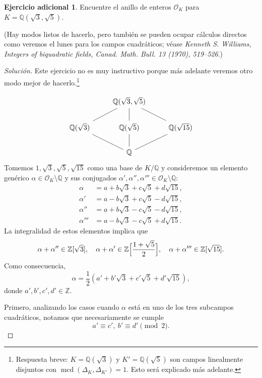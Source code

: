 \documentclass{article}
\theoremstyle{definition}
\newtheorem*{ejercicio-adicional}{Ejercicio adicional}
\newenvironment{solucion}{\begin{proof}[Solución]}{\end{proof}}
\newcommand{\ZZ}{\mathbb{Z}}
\newcommand{\QQ}{\mathbb{Q}}
\renewcommand{\gcd}{\operatorname{mcd}}
\renewcommand{\O}{\mathcal{O}}
\begin{document}
\begin{ejercicio-adicional}
  Encuentre el anillo de enteros $\mathcal{O}_K$ para
  $K = \mathbb{Q} (\sqrt{3}, \sqrt{5})$.

  \noindent (Hay modos listos de hacerlo, pero también se pueden ocupar cálculos
  directos como veremos el lunes para los campos cuadráticos; véase
  \emph{Kenneth S. Williams, Integers of biquadratic fields,
    Canad. Math. Bull. 13 (1970), 519--526}.)

  \ifdefined\solutions
  \begin{solucion}
    Este ejercicio no es muy instructivo porque más adelante veremos otro modo
    mejor de hacerlo.\footnote{Respuesta breve: $K = \QQ (\sqrt{3})$ y
      $K' = \QQ (\sqrt{5})$ son campos linealmente disjuntos con
      $\gcd (\Delta_K,\Delta_{K'}) = 1$. Esto será explicado más adelante.}

    \[ \begin{tikzcd}
      & \QQ(\sqrt{3},\sqrt{5})\ar[-]{dl}\ar[-]{d}\ar[-]{dr} \\
      \QQ(\sqrt{3})\ar[-]{dr} &
      \QQ(\sqrt{5})\ar[-]{d} &
      \QQ(\sqrt{15})\ar[-]{dl} \\
      & \QQ
      \end{tikzcd} \]
    Tomemos $1, \sqrt{3}, \sqrt{5},\sqrt{15}$ como una base de $K/\QQ$ y
    consideremos un elemento genérico $\alpha \in \O_K \setminus \QQ$ y sus
    conjugados $\alpha',\alpha'',\alpha''' \in \O_K \setminus \QQ$:
    \begin{align*}
      \alpha & = a + b\sqrt{3} + c\sqrt{5} + d\sqrt{15},\\
      \alpha' & = a - b\sqrt{3} + c\sqrt{5} - d\sqrt{15},\\
      \alpha'' & = a + b\sqrt{3} - c\sqrt{5} - d\sqrt{15},\\
      \alpha''' & = a - b\sqrt{3} - c\sqrt{5} + d\sqrt{15}.
    \end{align*}
    La integralidad de estos elementos implica que
    \[ \alpha + \alpha'' \in \ZZ [\sqrt{3}], \quad
       \alpha + \alpha' \in \ZZ \Bigl[\frac{1+\sqrt{5}}{2}\Bigr], \quad
       \alpha + \alpha''' \in \ZZ [\sqrt{15}]. \]
    Como consecuencia,
    $$\alpha = \frac{1}{2} (a' + b'\sqrt{3} + c'\sqrt{5} + d'\sqrt{15}),$$
    donde $a',b',c',d' \in \ZZ$.

    Primero, analizando los casos cuando $\alpha$ está en uno de los tres
    subcampos cuadráticos, notamos que necesariamente se cumple
    \[ \tag{*} a' \equiv c', ~ b' \equiv d' \pmod{2}. \]


\end{solucion}
\end{ejercicio-adicional}
\end{document}
